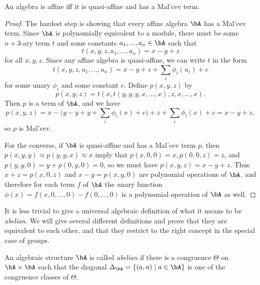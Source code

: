 \begin{prop}\label{affine-malcev} An algebra is affine iff it is quasi-affine and has a Mal'cev term.
\end{prop}
\begin{proof} The hardest step is showing that every affine algebra $\bA$ has a Mal'cev term. Since $\bA$ is polynomially equivalent to a module, there must be some $n+3$-ary term $t$ and some constants $a_1, ..., a_n \in \bA$ such that
\[
t(x,y,z,a_1, ..., a_n) = x-y+z
\]
for all $x,y,z$. Since any affine algebra is quasi-affine, we can write $t$ in the form
\[
t(x,y,z,u_1,...,u_n) = x-y+z + \sum_i \phi_i(u_i) + c
\]
for some unary $\phi_i$ and some constant $c$. Define $p(x,y,z)$ by
\[
p(x,y,z) = t(x,t(y,y,y,x,...,x),z,x,...,x).
\]
Then $p$ is a term of $\bA$, and we have
\[
p(x,y,z) = x-\big(y-y+y + \sum_i \phi_i(x) + c\big)+z + \sum_i \phi_i(x) + c = x-y+z,
\]
so $p$ is Mal'cev.

For the converse, if $\bA$ is quasi-affine and has a Mal'cev term $p$, then $p(x,y,y) \approx p(y,y,x) \approx x$ imply that $p(x,0,0) = x, p(0,0,z) = z$, and $p(y,y,0) = y + p(0,y,0) = 0$, so we must have $p(x,y,z) = x-y+z$. Thus $x+z = p(x,0,z)$ and $x-y = p(x,y,0)$ are polynomial operations of $\bA$, and therefore for each term $f$ of $\bA$ the unary function $\phi(x) = f(x,0,...,0) - f(0,...,0)$ is a polynomial operation of $\bA$ as well.
\end{proof}


It is less trivial to give a universal algebraic definition of what it means to be \emph{abelian}. We will give several different definitions and prove that they are equivalent to each other, and that they restrict to the right concept in the special case of groups.

\begin{defn} An algebraic structure $\bA$ is called \emph{abelian} if there is a congruence $\Theta$ on $\bA\times \bA$ such that the diagonal $\Delta_\bA = \{(a,a) \mid a \in \bA\}$ is one of the congruence classes of $\Theta$.
\end{defn}

